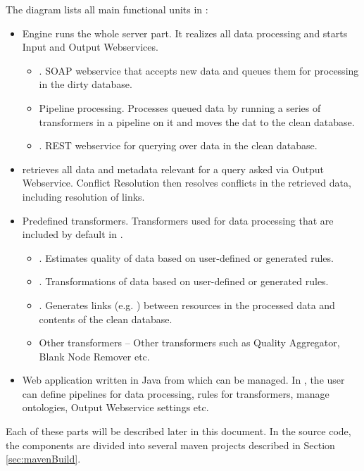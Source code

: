 The diagram lists all main functional units in \odcs:

\begin{itemize}
	\item {}
		Engine runs the whole server part. It realizes all data processing and starts Input and Output Webservices.

		\begin{itemize}
			\item {}. SOAP webservice that accepts new data and queues them for processing in the dirty database.
			\item Pipeline processing. Processes queued data by running a series of transformers in a pipeline on it and moves the dat to the clean database.
			\item {}. REST webservice for querying over data in the clean database.
		\end{itemize}
	\item {}
		\QE retrieves all data and metadata relevant for a query asked via Output Webservice. Conflict Resolution then resolves conflicts in the retrieved data, including resolution of  links.
	\item Predefined transformers.
		Transformers used for data processing that are included by default in \odcs.
		\begin{itemize}
			\item {}. Estimates quality of data based on user-defined or generated rules.
			\item {}. Transformations of data based on user-defined or generated rules.
			\item {}. Generates links (e.g. ) between resources in the processed data and contents of the clean database.
			\item Other transformers -- Other transformers such as Quality Aggregator, Blank Node Remover etc.
		\end{itemize}
	\item {}
		Web application written in Java from which \odcs can be managed. In \FE, the user can define pipelines for data processing, rules for transformers, manage ontologies, Output Webservice settings etc.
\end{itemize}

Each of these parts will be described later in this document. In the source code, the components are divided into several maven projects described in Section \ref{sec:mavenBuild}.

